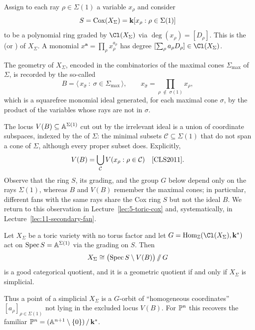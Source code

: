 \documentclass{amsart}
\begin{document}
Assign to each ray $\rho\in\Sigma(1)$ a variable $x_\rho$ and consider
\[ S = \operatorname{Cox}(X_\Sigma) = {\bf k}[x_\rho : \rho\in\Sigma(1)] \]
to be a polynomial ring graded by $\Cl(X_\Sigma)$ via $\deg(x_\rho)=[D_\rho]$. This is the  (or ) of $X_\Sigma$. A monomial $x^{\mathbf a}=\prod_\rho x_\rho^{a_\rho}$ has degree $[\sum_\rho a_\rho D_\rho]\in\Cl(X_\Sigma)$.

The geometry of $X_\Sigma$, encoded in the combinatorics of the maximal cones $\Sigma_{\max}$ of $\Sigma$, is recorded by the so-called  
\[
B = \bigl\langle\, x_{\widehat\sigma}\ :\ \sigma\in\Sigma_{\max}\,\bigr\rangle, \qquad
x_{\widehat\sigma} = \prod_{\rho\;\notin\;\sigma(1)} x_\rho,
\]
which is a squarefree monomial ideal generated, for each maximal cone $\sigma$, by the product of the variables whose rays are not in $\sigma$.

\begin{remark}\label{rem:primitive}
  The locus $V(B)\subseteq\mathbb A^{\Sigma(1)}$ cut out by the irrelevant ideal is a union of coordinate subspaces, indexed by the  of $\Sigma$: the minimal subsets $\mathcal C\subseteq\Sigma(1)$ that do not span a cone of $\Sigma$, although every proper subset does. Explicitly,
  \[ V(B) = \bigcup_{\mathcal C} V(x_\rho : \rho\in\mathcal C) \quad \text{\cite[Prop.~5.1.6]{CLS2011}}. \]
  Observe that the ring $S$, its grading, and the group $G$ below depend only on the rays $\Sigma(1)$, whereas $B$ and $V(B)$ remember the maximal cones; in particular, different fans with the same rays share the Cox ring $S$ but not the ideal $B$. We return to this observation in Lecture~\ref{lec:5-toric-cox} and, systematically, in Lecture~\ref{lec:11-secondary-fan}.
\end{remark}

\begin{thm}\label{thm:coxquotient}
  Let $X_\Sigma$ be a toric variety with no torus factor and let $G = \Hom_\ZZ(\Cl(X_\Sigma), \kk^*)$ act on $\operatorname{Spec} S=\mathbb A^{\Sigma(1)}$ via the grading on $S$. Then
  \[ X_\Sigma \cong \bigl(\operatorname{Spec} S\setminus V(B)\bigr)\,/\!\!/\,G \]
  is a good categorical quotient, and it is a geometric quotient if and only if $X_\Sigma$ is simplicial.
\end{thm}

Thus a point of a simplicial $X_\Sigma$ is a $G$-orbit of ``homogeneous coordinates'' $[a_\rho]_{\rho\in\Sigma(1)}$ not lying in the excluded locus $V(B)$. For $\mathbb P^n$ this recovers the familiar $\mathbb P^n=(\mathbb A^{n+1}\setminus\{0\})\,/\,{\bf k}^*$.
\end{document}
